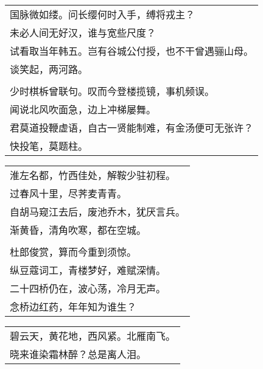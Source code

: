 \noindent\begin{minipage}{\linewidth}
  \vskip-3pt\begin{table}[H]
    \centering
    \begin{tabular}{@{}l@{}}
国脉微如缕。问长缨何时入手，缚将戎主？\\
未必人间无好汉，谁与宽些尺度？\\
试看取当年韩五。岂有谷城公付授，也不干曾遇骊山母。\\
谈笑起，两河路。\\
\\
少时棋柝曾联句。叹而今登楼揽镜，事机频误。\\
闻说北风吹面急，边上冲梯屡舞。\\
君莫道投鞭虚语，自古一贤能制难，有金汤便可无张许？\\
快投笔，莫题柱。
    \end{tabular}
  \end{table}
\end{minipage}
\vspace{1cm}


\noindent\begin{minipage}{\linewidth}
  \vskip-3pt\begin{table}[H]
    \centering
    \begin{tabular}{@{}l@{}}
淮左名都，竹西佳处，解鞍少驻初程。\\
过春风十里，尽荠麦青青。\\
自胡马窥江去后，废池乔木，犹厌言兵。\\
渐黄昏，清角吹寒，都在空城。\\
\\
杜郎俊赏，算而今重到须惊。\\
纵豆蔻词工，青楼梦好，难赋深情。\\
二十四桥仍在，波心荡，冷月无声。\\
念桥边红药，年年知为谁生？
    \end{tabular}
  \end{table}
\end{minipage}
\vspace{1cm}


\noindent\begin{minipage}{\linewidth}
  \vskip-3pt\begin{table}[H]
    \centering
    \begin{tabular}{@{}l@{}}
碧云天，黄花地，西风紧。北雁南飞。\\
晓来谁染霜林醉？总是离人泪。
    \end{tabular}
  \end{table}
\end{minipage}
\vspace{1cm}



